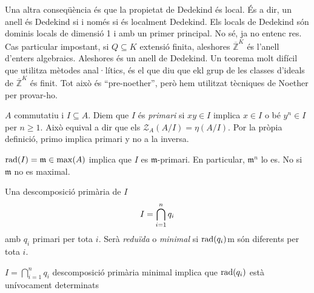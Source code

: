 \documentclass[../../../main.tex]{subfiles}
\begin{document}
Una altra conseqüència és que la propietat de Dedekind és local. És a dir, un anell és Dedekind si i només si és localment Dedekind. Els locals de Dedekind són dominis locals de dimensió 1 i amb un primer principal. No sé, ja no entenc res. Cas particular impostant, si $Q\subseteq K$ extensió finita, aleshores $\overline{\mathbb{Z}}^K$ és l'anell d'enters algebraics. Aleshores és un anell de Dedekind. Un teorema molt difícil que utilitza mètodes anal·lítics, és el que diu que ekl grup de les classes d'ideals de $\overline{\mathbb{Z}}^K$ és finit. Tot això és ``pre-noether'', però hem utilitzat tècniques de Noether per provar-ho.

$A$ commutatiu i $I\subseteq A$. Diem que $I$ és \textit{primari} si $xy\in I$ implica $x\in I$ o bé $y^n\in I$ per $n\geq1$. Això equival a dir que els $\mathcal{Z}_A(A/I) = \eta(A/I)$. Por la pròpia definició, primo implica primari y no a la inversa. 

$\operatorname{\mathrm{rad}}(I)=\mathfrak{m}\in\max(A)$ implica que $I$ es $\mathfrak{m}$-primari. En particular, $\mathfrak{m}^n$ lo es. No si $\mathfrak{m}$ no es maximal.

\begin{defi}
Una descomposició primària de $I$
\begin{equation}
    \notag
    I = \bigcap_{i=1}^nq_i
\end{equation}
amb $q_i$ primari per tota $i$. Serà \textit{reduïda} o \textit{minimal} si $\operatorname{\mathrm{rad}}(q_i)$m són diferents per tota $i$.
\end{defi}

\begin{ter}
$I = \bigcap_{i=1}^nq_i$ descomposició primària minimal implica que $\operatorname{\mathrm{rad}}(q_i)$ està unívocament determinats
\end{ter}
\end{document}
